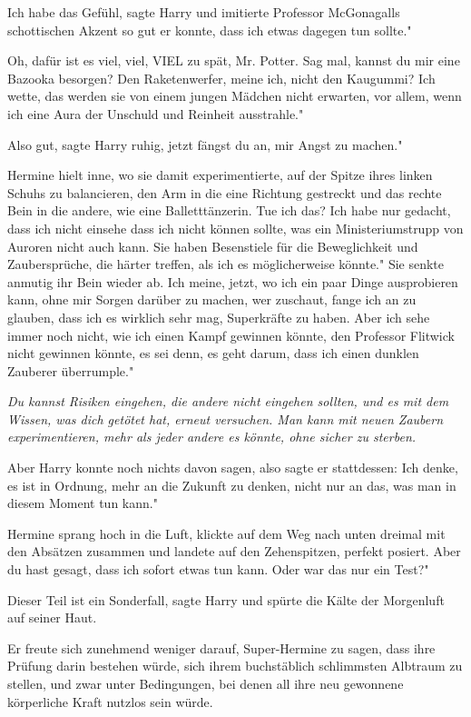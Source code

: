 \glqq Ich habe das Gefühl\grqq{}, sagte Harry und imitierte Professor
McGonagalls schottischen Akzent so gut er konnte, \glqq dass ich etwas dagegen
tun sollte."

\glqq Oh, dafür ist es viel, viel, VIEL zu spät, Mr. Potter. Sag mal, kannst du
mir eine Bazooka besorgen? Den Raketenwerfer, meine ich, nicht den Kaugummi? Ich
wette, das werden sie von einem jungen Mädchen nicht erwarten, vor allem, wenn
ich eine Aura der Unschuld und Reinheit ausstrahle."

\glqq Also gut\grqq{}, sagte Harry ruhig, \glqq jetzt fängst du an, mir Angst zu
machen."

Hermine hielt inne, wo sie damit experimentierte, auf der Spitze ihres linken
Schuhs zu balancieren, den Arm in die eine Richtung gestreckt und das rechte
Bein in die andere, wie eine Balletttänzerin. \glqq Tue ich das? Ich habe nur
gedacht, dass ich nicht einsehe dass ich nicht können sollte, was ein
Ministeriumstrupp von Auroren nicht auch kann. Sie haben Besenstiele für die
Beweglichkeit und Zaubersprüche, die härter treffen, als ich es möglicherweise
könnte." Sie senkte anmutig ihr Bein wieder ab. \glqq Ich meine, jetzt, wo ich
ein paar Dinge ausprobieren kann, ohne mir Sorgen darüber zu machen, wer
zuschaut, fange ich an zu glauben, dass ich es wirklich sehr mag, Superkräfte zu
haben. Aber ich sehe immer noch nicht, wie ich einen Kampf gewinnen könnte, den
Professor Flitwick nicht gewinnen könnte, es sei denn, es geht darum, dass ich
einen dunklen Zauberer überrumple."

\emph{Du kannst Risiken eingehen, die andere nicht eingehen sollten, und es mit dem Wissen, was dich getötet hat, erneut versuchen. Man kann mit neuen Zaubern experimentieren, mehr als jeder andere es könnte, ohne sicher zu sterben.}

Aber Harry konnte noch nichts davon sagen, also sagte er stattdessen: \glqq Ich
denke, es ist in Ordnung, mehr an die Zukunft zu denken, nicht nur an das, was
man in diesem Moment tun kann."

Hermine sprang hoch in die Luft, klickte auf dem Weg nach unten dreimal mit den
Absätzen zusammen und landete auf den Zehenspitzen, perfekt posiert. \glqq Aber
du hast gesagt, dass ich sofort etwas tun kann. Oder war das nur ein Test?"

\glqq Dieser Teil ist ein Sonderfall\grqq{}, sagte Harry und spürte die Kälte
der Morgenluft auf seiner Haut.

Er freute sich zunehmend weniger darauf, Super-Hermine zu sagen, dass ihre
Prüfung darin bestehen würde, sich ihrem buchstäblich schlimmsten Albtraum zu
stellen, und zwar unter Bedingungen, bei denen all ihre neu gewonnene
körperliche Kraft nutzlos sein würde.

